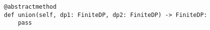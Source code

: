 \begin{verbatim}
@abstractmethod
def union(self, dp1: FiniteDP, dp2: FiniteDP) -> FiniteDP:
    pass
\end{verbatim}